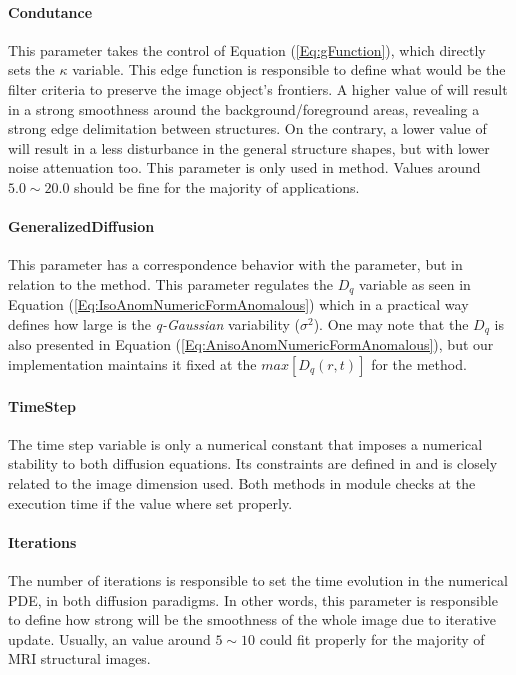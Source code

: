 \documentclass{InsightArticle}
\begin{document}
\paragraph{Condutance}
 This parameter takes the control of Equation (\ref{Eq:gFunction}), which directly sets the $\kappa$ variable. This edge function is responsible to define what would be the filter criteria to preserve the image object’s frontiers. A higher value of  will result in a strong smoothness around the background/foreground areas, revealing a strong edge delimitation between structures. On the contrary, a lower value of  will result in a less disturbance in the general structure shapes, but with lower noise attenuation too. This parameter is only used in  method. Values around $5.0\sim20.0$ should be fine for the majority of applications.

 \paragraph{GeneralizedDiffusion}
 This parameter has a correspondence behavior with the  parameter, but in relation to the  method. This parameter regulates the $D_q$ variable as seen in Equation (\ref{Eq:IsoAnomNumericFormAnomalous}) which in a practical way defines how large is the \textit{q-Gaussian} variability ($\sigma^{2}$). One may note that the $D_q$ is also presented in Equation (\ref{Eq:AnisoAnomNumericFormAnomalous}), but our implementation maintains it fixed at the $max[D_q(r,t)]$ for the  method.
 
 \paragraph{TimeStep}
 The time step variable is only a numerical constant that imposes a numerical stability to both diffusion equations. Its constraints are defined in \cite{SenraFilho2015, PERONA1990} and is closely related to the image dimension used. Both methods in  module checks at the execution time if the  value where set properly.
 
 \paragraph{Iterations}
 The number of iterations is responsible to set the time evolution in the numerical PDE, in both diffusion paradigms. In other words, this parameter is responsible to define how strong will be the smoothness of the whole image due to iterative update. Usually, an  value around $5\sim10$ could fit properly for the majority of MRI structural images.
 
\end{document}
